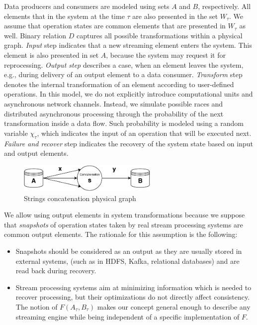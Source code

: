 Data producers and consumers are modeled using sets $A$ and $B$, respectively. All elements that in the system at the time $\tau$ are also presented in the set $W_\tau$. We assume that operation states are common elements that are presented in $W_\tau$ as well. Binary relation $D$ captures all possible transformations within a physical graph. {\em Input} step indicates that a new streaming element enters the system. This element is also presented in set $A$, because the system may request it for reprocessing. {\em Output step} describes a case, when an element leaves the system, e.g., during delivery of an output element to a data consumer. {\em Transform} step denotes the internal transformation of an element according to user-defined operations. In this model, we do not explicitly introduce computational units and asynchronous network channels. Instead, we simulate possible races and distributed asynchronous processing through the probability of the next transformation inside a data flow. Such probability is modeled using a random variable $\chi_\tau$, which indicates the input of an operation that will be executed next. {\em Failure and recover} step indicates the recovery of the system state based on input and output elements.

\begin{figure}[t]
  \centering
  \includegraphics[width=0.6\textwidth]{Chapters/DeliveryGuarantees/pics/concat.pdf}
  \caption{Strings concatenation physical graph}
  \label{concat}
\end{figure}

We allow using output elements in system transformations because we suppose that {\em snapshots} of operation states taken by real stream processing systems are common output elements. The rationale for this assumption is the following:

\begin{itemize}
    \item Snapshots should be considered as an output as they are usually stored in external systems, (such as in HDFS, Kafka, relational databases)   and are read back during recovery. 
    \item Stream processing systems aim at minimizing information which is needed to recover processing, but their optimizations do not directly affect consistency. The notion of $F(A_\tau, B_\tau)$ makes our concept general enough to describe any streaming engine while being independent of a specific implementation of $F$.
\end{itemize}

